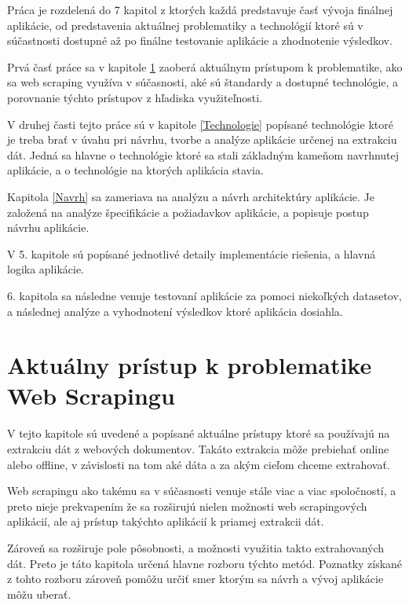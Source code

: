 \newpage

Práca je rozdelená do 7 kapitol z ktorých každá predstavuje časť vývoja finálnej aplikácie, od predstavenia aktuálnej problematiky a technológií ktoré sú v súčastnosti dostupné až po finálne testovanie aplikácie a zhodnotenie výsledkov.

\bigskip

Prvá časť práce sa v kapitole \ref{aktualny_pristup} zaoberá aktuálnym prístupom k problematike, ako sa web scraping využíva v súčasnosti, aké sú štandardy a dostupné technológie, a porovnanie týchto prístupov z hľadiska využiteľnosti.

V druhej časti tejto práce sú v kapitole \ref{Technologie} popísané technológie ktoré je treba brať v úvahu pri návrhu, tvorbe a analýze aplikácie určenej na extrakciu dát. Jedná sa hlavne o technológie ktoré sa stali základným kameňom navrhnutej aplikácie, a o technológie na ktorých aplikácia stavia.

Kapitola \ref{Navrh} sa zameriava na analýzu a návrh architektúry aplikácie. Je založená na analýze špecifikácie a požiadavkov aplikácie, a popisuje postup návrhu aplikácie.

V 5. kapitole sú popísané jednotlivé detaily implementácie riešenia, a hlavná logika aplikácie.

6. kapitola sa následne venuje testovaní aplikácie za pomoci niekoľkých datasetov, a následnej analýze a vyhodnotení výsledkov ktoré aplikácia dosiahla.


\chapter{Aktuálny prístup k problematike Web Scrapingu}
\label{aktualny_pristup}

V tejto kapitole sú uvedené a popísané aktuálne prístupy ktoré sa používajú na extrakciu dát z webových dokumentov. Takáto extrakcia môže prebiehať online alebo offline, v závislosti na tom aké dáta a za akým cieľom chceme extrahovať.

Web scrapingu ako takému sa v súčasnosti venuje stále viac a viac spoločností, a preto nieje prekvapením že sa rozširujú nielen možnosti web scrapingových aplikácií, ale aj prístup takýchto aplikácií k priamej extrakcii dát.

Zároveň sa rozširuje pole pôsobnosti, a možnosti využitia takto extrahovaných dát. Preto je táto kapitola určená hlavne rozboru týchto metód. Poznatky získané z tohto rozboru zároveň pomôžu určiť smer ktorým sa návrh a vývoj aplikácie môžu uberať. 

